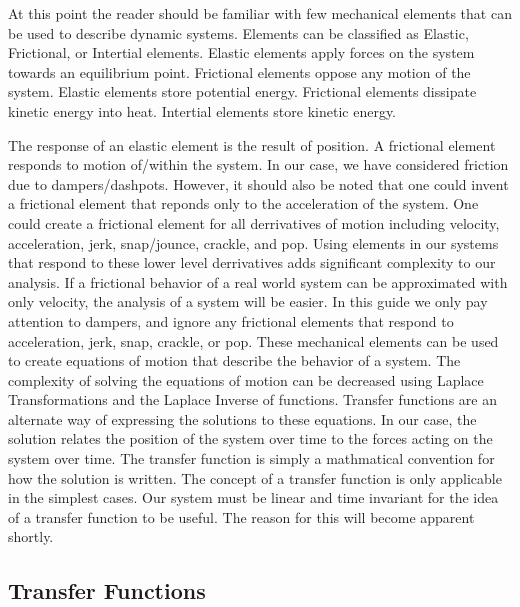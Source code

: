 \documentclass{tufte-book} %
\begin{document}
\begin{fullwidth}

At this point the reader should be familiar with few mechanical elements that can be used to describe dynamic systems. Elements can be classified as Elastic, Frictional, or Intertial elements. Elastic elements apply forces on the system towards an equilibrium point. Frictional elements oppose any motion of the system. Elastic elements store potential energy. Frictional elements dissipate kinetic energy into heat. Intertial elements store kinetic energy.


The response of an elastic element is the result of position. A frictional element responds to motion of/within the system. In our case, we have considered friction due to dampers/dashpots. However, it should also be noted that one could invent a frictional element that reponds only to the acceleration of the system. One could create a frictional element for all derrivatives of motion including velocity, acceleration, jerk, snap/jounce, crackle, and pop. Using elements in our systems that respond to these lower level derrivatives adds significant complexity to our analysis. If a frictional behavior of a real world system can be approximated with only velocity, the analysis of a system will be easier. In this guide we only pay attention to dampers, and ignore any frictional elements that respond to acceleration, jerk, snap, crackle, or pop. 
\newline
These mechanical elements can be used to create equations of motion that describe the behavior of a system. The complexity of solving the equations of motion can be decreased using Laplace Transformations and the Laplace Inverse of functions. 
\newline
Transfer functions are an alternate way of expressing the solutions to these equations. In our case, the solution relates the position of the system over time to the forces acting on the system over time. The transfer function is simply a mathmatical convention for how the solution is written. The concept of a transfer function is only applicable in the simplest cases. Our system must be linear and time invariant for the idea of a transfer function to be useful. The reason for this will become apparent shortly.
\newline

\end{fullwidth}

\subsection{Transfer Functions}
\end{document}
